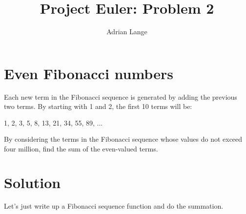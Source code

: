 \documentclass[11pt, oneside]{article}   	%
\title{Project Euler: Problem 2}
\author{Adrian Lange}
\begin{document}
\maketitle
\section{Even Fibonacci numbers}
Each new term in the Fibonacci sequence is generated by adding the previous two terms. By starting with 1 and 2, the first 10 terms will be:

1, 2, 3, 5, 8, 13, 21, 34, 55, 89, ...

By considering the terms in the Fibonacci sequence whose values do not exceed four million, find the sum of the even-valued terms.

\section{Solution}
Let's just write up a Fibonacci sequence function and do the summation.
\end{document}
